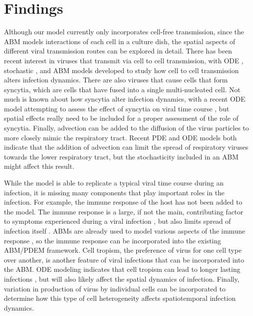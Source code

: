 \section{Findings}

Although our model currently only incorporates cell-free transmission, since the ABM models interactions of each cell in a culture dish, the spatial aspects of different viral transmission routes can be explored in detail. There has been recent interest in viruses that transmit via cell to cell transmission, with ODE \cite{allen15,komarova13,iwami15}, stochastic \cite{graw15}, and ABM \cite{kumberger18,blahut21} models developed to study how cell to cell transmission alters infection dynamics. There are also viruses that cause cells that form syncytia, which are cells that have fused into a single multi-nucleated cell. Not much is known about how syncytia alter infection dynamics, with a recent ODE model attempting to assess the effect of syncytia on viral time course \cite{jessie21}, but spatial effects really need to be included for a proper assessment of the role of syncytia. Finally, advection can be added to the diffusion of the virus particles to more closely mimic the respiratory tract. Recent PDE \cite{quirouette20} and ODE \cite{gonzalez19} models both indicate that the addition of advection can limit the spread of respiratory viruses towards the lower respiratory tract, but the stochasticity included in an ABM might affect this result. 

While the model is able to replicate a typical viral time course during an infection, it is missing many components that play important roles in the infection. For example, the immune response of the host has not been added to the model. The immune response is a large, if not the main, contributing factor to symptoms experienced during a viral infection \cite{manchanda14,zheng18}, but also limits spread of infection itself \cite{dobrovolny13}. ABMs are already used to model various aspects of the immune response \cite{whitman20,kerepesi19,levin16}, so the immune response can be incorporated into the existing ABM/PDEM framework. Cell tropism, the preference of virus for one cell type over another, is another feature of viral infections that can be incorporated into the ABM. ODE modeling indicates that cell tropism can lead to longer lasting infections \cite{dobrovolny10}, but will also likely affect the spatial dynamics of infection. Finally, variation in production of virus by individual cells \cite{timm12} can be incorporated to determine how this type of cell heterogeneity affects spatiotemporal infection dynamics.

